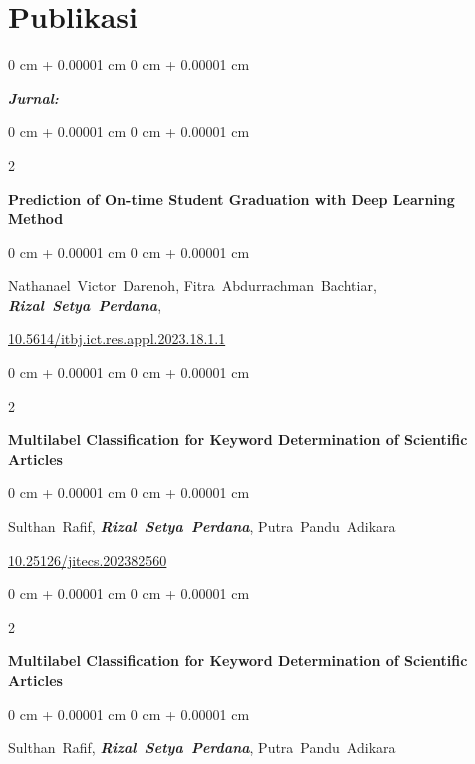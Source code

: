 \documentclass[10pt, letterpaper]{article}
\newenvironment{onecolentry}{
    \begin{adjustwidth}{
        0 cm + 0.00001 cm
    }{
        0 cm + 0.00001 cm
    }
}{
    \end{adjustwidth}
} %
\newenvironment{twocolentry}[2][]{
    \onecolentry
    \def\secondColumn{#2}
    \setcolumnwidth{\fill, 4.5 cm}
    \begin{paracol}{2}
}{
    \switchcolumn \raggedleft \secondColumn
    \end{paracol}
    \endonecolentry
} %
\begin{document}
\section{Publikasi}
        \begin{onecolentry}
            \textit{\textbf{Jurnal:}}
            \vspace{0.50 cm}
        \begin{samepage}
            \begin{twocolentry}{2024}
                \textbf{Prediction of On-time Student Graduation with Deep Learning Method}
            \end{twocolentry}
            \vspace{0.10 cm}
            \begin{onecolentry}
                \mbox{Nathanael Victor Darenoh},
                \mbox{Fitra Abdurrachman Bachtiar},
                 \mbox{\textbf{\textit{Rizal Setya Perdana}}},
                 
                \vspace{0.10 cm}
                \href{https://doi.org/10.5614/itbj.ict.res.appl.2023.18.1.1}{10.5614/itbj.ict.res.appl.2023.18.1.1}
            \end{onecolentry}
        \end{samepage}

        \vspace{0.3 cm}
        \begin{samepage}
            \begin{twocolentry}{2023}
                \textbf{Multilabel Classification for Keyword Determination of Scientific Articles}
            \end{twocolentry}
            \vspace{0.10 cm}
            \begin{onecolentry}
                \mbox{Sulthan Rafif},
                \mbox{\textbf{\textit{Rizal Setya Perdana}}},
                \mbox{Putra Pandu Adikara}
                 
                \vspace{0.10 cm}
                \href{https://doi.org/10.25126/jitecs.202382560}{10.25126/jitecs.202382560}
            \end{onecolentry}
        \end{samepage}

        
        \vspace{0.3 cm}
        \begin{samepage}
            \begin{twocolentry}{2023}
                \textbf{Multilabel Classification for Keyword Determination of Scientific Articles}
            \end{twocolentry}
            \vspace{0.10 cm}
            \begin{onecolentry}
                \mbox{Sulthan Rafif},
                \mbox{\textbf{\textit{Rizal Setya Perdana}}},
                \mbox{Putra Pandu Adikara}
                 

\end{onecolentry}
\end{samepage}
\end{onecolentry}
\end{document}
